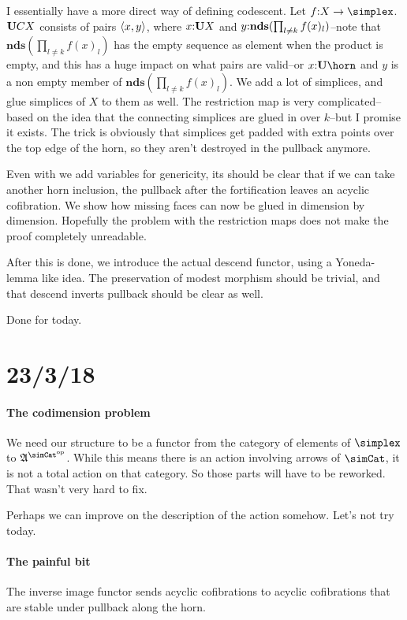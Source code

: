 \documentclass[csh.tex]{subfiles}
\begin{document}
I essentially have a more direct way of defining codescent. Let $f\of X\to \simplex$.
$\mathbf{U} CX$ consists of pairs $\left\langle x,y \right\rangle$, where $x\mathord : \mathbf{U} X$ and $y\mathord : \mathbf{nds}(\prod_{l\neq k} f(x)_l)$--note that $\mathbf{nds}(\prod_{l\neq k} f(x)_l)$ has the empty sequence as element when the product is empty, and this has a huge impact on what pairs are valid--or $x\of
\base\horn$ and $y$ is a non empty member of $\mathbf{nds}(\prod_{l\neq k} f(x)_l)$. We add a lot of simplices, and glue simplices of $X$ to them as well.
The restriction map is very complicated--based on the idea that the connecting simplices are glued in over $k$--but I promise it exists.
The trick is obviously that simplices get padded with extra points over the top edge of the horn, so they aren't destroyed in the pullback anymore.

Even with we add variables for genericity, its should be clear that if we can take another horn inclusion, the pullback after the fortification leaves an acyclic cofibration. We show how missing faces can now be glued in dimension by dimension. Hopefully the problem with the restriction maps does not make the proof completely unreadable.

After this is done, we introduce the actual descend functor, using a Yoneda-lemma like idea. The preservation of modest morphism should be trivial, and that descend inverts pullback should be clear as well.

Done for today.

\section{23/3/18}
\paragraph{The codimension problem}
We need our structure to be a functor from the category of elements of $\simplex$ to $\ambient\s$. While this means there is an action involving arrows of $\simCat$, it is not a total action on that category. So those parts will have to be reworked. That wasn't very hard to fix.

Perhaps we can improve on the description of the action somehow. Let's not try today.

\paragraph{The painful bit}
The inverse image functor sends acyclic cofibrations to acyclic cofibrations that are stable under pullback along the horn.
\end{document}
